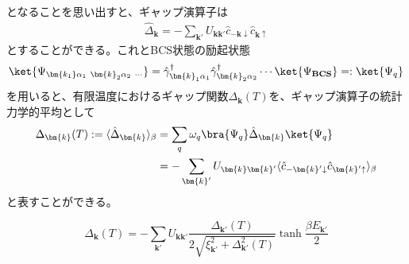 \documentclass[dvipdfmx, 11pt, a4paper]{jsarticle}
\numberwithin{equation}{section}
\theoremstyle{definition}
\begin{document}
    となることを思い出すと、ギャップ演算子は
    \begin{align}
        \hat{\Delta}_{\bm{k}} = -\sum_{\bm{k}'} U_{\bm{k}\bm{k}'} \hat{c}_{-\bm{k}\downarrow} \hat{c}_{\bm{k}\uparrow}
    \end{align}
    とすることができる。これとBCS状態の励起状態
    \begin{align}
        \ket{\Psi_{\bm{k_1}\alpha_1\ \bm{k}_2\alpha_2\ \cdots}} = \hat{\gamma}_{\bm{k}_1 \alpha_1}^\dagger \hat{\gamma}_{\bm{k}_2 \alpha_2}^\dagger \cdots \ket{\Psi_{\textbf{BCS}}} =: \ket{\Psi_q}
    \end{align}
    を用いると、有限温度におけるギャップ関数$\Delta_{\bm{k}}(T)$を、ギャップ演算子の統計力学的平均として
    \begin{align}
        \Delta_{\bm{k}}(T) := \langle \hat{\Delta}_{\bm{k}} \rangle_{\beta} &=  \sum_{q} \omega_q \bra{\Psi_q} \hat{\Delta}_{\bm{k}} \ket{\Psi_q} \notag \\
        &= -\sum_{\bm{k}'} U_{\bm{k}\bm{k}'} \langle \hat{c}_{-\bm{k}'\downarrow} \hat{c}_{\bm{k}'\uparrow} \rangle_{\beta} 
    \end{align}
    と表すことができる。
    \begin{definition}[有限温度におけるギャップ方程式]
        \begin{equation}
            \Delta_{\bm{k}}(T) = -\sum_{\bm{k}'} U_{\bm{k}\bm{k}'}  \frac{\Delta_{\bm{k}'}(T)}{2\sqrt{\xi_{\bm{k}'}^2 + \Delta_{\bm{k}'}^2(T)}} \tanh \frac{\beta E_{\bm{k}'}}{2}
        \end{equation}
    \end{definition}
\end{document}
